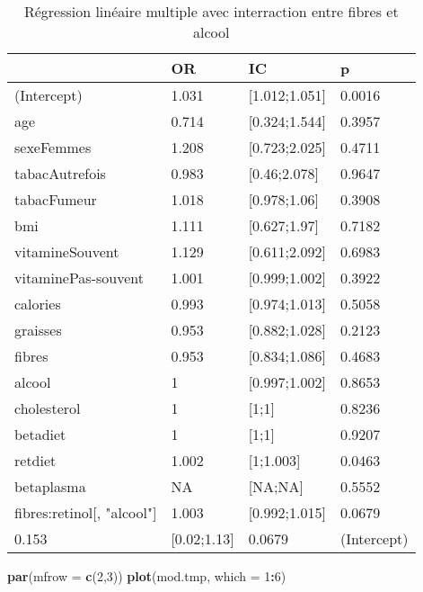 \documentclass[]{article}
\newenvironment{Shaded}{\begin{snugshade}}{\end{snugshade}}
\newcommand{\KeywordTok}[1]{\textcolor[rgb]{0.13,0.29,0.53}{\textbf{#1}}}
\newcommand{\DataTypeTok}[1]{\textcolor[rgb]{0.13,0.29,0.53}{#1}}
\newcommand{\DecValTok}[1]{\textcolor[rgb]{0.00,0.00,0.81}{#1}}
\newcommand{\OperatorTok}[1]{\textcolor[rgb]{0.81,0.36,0.00}{\textbf{#1}}}
\newcommand{\NormalTok}[1]{#1}
\begin{document}
\begin{table}

\caption{\label{tab:unnamed-chunk-90}Régression linéaire multiple avec interraction entre fibres et alcool}
\centering
\begin{tabular}[t]{l|l|l|l}
\hline
  & OR & IC & p\\
\hline
\rowcolor[HTML]{BBD2E1}  (Intercept) & 1.031 & [1.012;1.051] & 0.0016\\
\hline
age & 0.714 & [0.324;1.544] & 0.3957\\
\hline
\rowcolor[HTML]{BBD2E1}  sexeFemmes & 1.208 & [0.723;2.025] & 0.4711\\
\hline
tabacAutrefois & 0.983 & [0.46;2.078] & 0.9647\\
\hline
\rowcolor[HTML]{BBD2E1}  tabacFumeur & 1.018 & [0.978;1.06] & 0.3908\\
\hline
bmi & 1.111 & [0.627;1.97] & 0.7182\\
\hline
\rowcolor[HTML]{BBD2E1}  vitamineSouvent & 1.129 & [0.611;2.092] & 0.6983\\
\hline
vitaminePas-souvent & 1.001 & [0.999;1.002] & 0.3922\\
\hline
\rowcolor[HTML]{BBD2E1}  calories & 0.993 & [0.974;1.013] & 0.5058\\
\hline
graisses & 0.953 & [0.882;1.028] & 0.2123\\
\hline
\rowcolor[HTML]{BBD2E1}  fibres & 0.953 & [0.834;1.086] & 0.4683\\
\hline
alcool & 1 & [0.997;1.002] & 0.8653\\
\hline
\rowcolor[HTML]{BBD2E1}  cholesterol & 1 & [1;1] & 0.8236\\
\hline
betadiet & 1 & [1;1] & 0.9207\\
\hline
\rowcolor[HTML]{BBD2E1}  retdiet & 1.002 & [1;1.003] & 0.0463\\
\hline
betaplasma & NA & [NA;NA] & 0.5552\\
\hline
\rowcolor[HTML]{BBD2E1}  fibres:retinol[, "alcool"] & 1.003 & [0.992;1.015] & 0.0679\\
\hline
0.153 & [0.02;1.13] & 0.0679 & (Intercept)\\
\hline
\end{tabular}
\end{table}

\begin{Shaded}
\begin{Highlighting}[]
\KeywordTok{par}\NormalTok{(}\DataTypeTok{mfrow =} \KeywordTok{c}\NormalTok{(}\DecValTok{2}\NormalTok{,}\DecValTok{3}\NormalTok{))}
\KeywordTok{plot}\NormalTok{(mod.tmp, }\DataTypeTok{which =} \DecValTok{1}\OperatorTok{:}\DecValTok{6}\NormalTok{)}
\end{Highlighting}
\end{Shaded}
\end{document}

